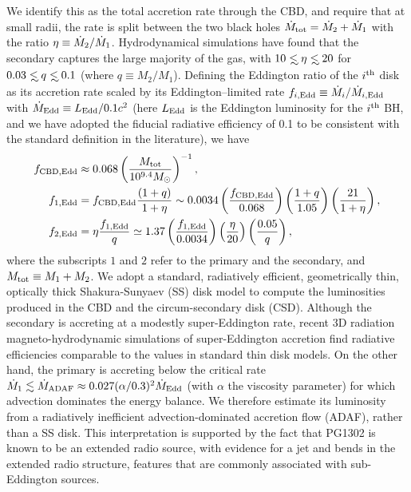 We identify this as the total accretion rate through the CBD, and
require that at small radii, the rate is split between the two black
holes $\dot{M}_{\rm tot} = \dot{M}_2 + \dot{M}_1$ with the ratio $\eta\equiv
\dot{M}_2/\dot{M}_1$.  Hydrodynamical simulations\cite{Farris+2014} have
found that the secondary captures the large majority of the gas, with
$10\lsim \eta \lsim 20$ for $0.03\lsim q \lsim 0.1$ (where $q\equiv
M_2/M_1$).  Defining the Eddington ratio of the $i^{\rm{th}}$ disk as
its accretion rate scaled by its Eddington--limited rate
$f_{i,\rm{Edd}}\equiv \dot{M}_i/\dot{M}_{i,\rm{Edd}}$ with $\dot{M}_{\rm
  Edd} \equiv L_{\rm Edd}/0.1c^2$ (here $L_{\rm Edd}$ is the Eddington
luminosity for the $i^{\rm th}$ BH, and we have adopted the fiducial
radiative efficiency of 0.1 to be consistent with the standard
definition in the literature), we have
%
\begin{align}
f_{\rm{CBD,Edd}} & \approx   0.068 \left( \frac{M_{\rm tot}}{10^{9.4} \Msun} \right)^{-1}, \nonumber \\
%
f_{\rm{1,Edd}} &= f_{\rm{CBD,Edd}}  \frac{ \left( 1+q \right)}{1 + \eta}  \sim 0.0034 \left( \frac{ f_{\rm{CBD,Edd}}}{0.068} \right) \left(\frac{1+q}{1.05}\right) \left( \frac{21}{1+\eta}\right), \nonumber \\
%
f_{\rm{2,Edd}} &=\eta \frac{f_{\rm{1,Edd}}}{q} \simeq 1.37  \left( \frac{ f_{\rm{1,Edd}}}{0.0034} \right) \left( \frac{\eta}{20}\right) \left( \frac{0.05}{q}\right),
%
\label{Eq:TDfEdds}
\end{align}
%
where the subscripts $1$ and $2$ refer to the primary and the
secondary, and $M_{\rm tot} \equiv M_1 + M_2$.  We adopt a standard,
radiatively efficient, geometrically thin, optically thick
Shakura-Sunyaev (SS) disk model\cite{SS73} to compute the luminosities
produced in the CBD and the circum-secondary disk (CSD). Although the
secondary is accreting at a modestly super-Eddington rate, recent 3D
radiation magneto-hydrodynamic simulations of super-Eddington
accretion find radiative efficiencies comparable to the values in
standard thin disk models\cite{Jiang+2014}.  On the other hand, the
primary is accreting below the critical rate $\dot{M}_{\rm{1}}
\lesssim \dot{M}_{\rm{ADAF}} \approx 0.027 (\alpha/0.3)^2
\dot{M}_{\rm{Edd}}$ (with $\alpha$ the viscosity parameter) for which
advection dominates the energy balance\cite{NarayanMcClintock2008}. We
therefore estimate its luminosity from a radiatively inefficient
advection-dominated accretion flow (ADAF)\cite{Mahadevan:1997,
  NMQ:ADAF:1998}, rather than a SS disk.  This interpretation is
supported by the fact that PG1302 is known to be an extended radio
source, with evidence for a jet and bends in the extended radio
structure\cite{Hutchings+2014}, features that are commonly associated
with sub-Eddington sources\cite{WangHoStaubert2003}.

